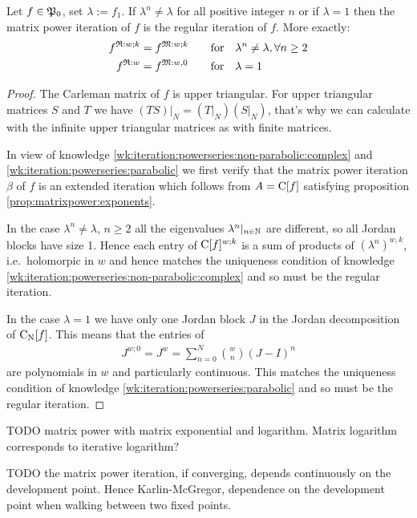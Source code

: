 \documentclass{article}
\numberwithin{equation}{section}
\begin{document}
\begin{proposition}
  Let $f\in\pso$, set $\lambda:=f_1$. If $\lambda^n \neq \lambda$ for all
  positive integer $n$ or if $\lambda=1$ then the matrix
  power iteration of $f$ is the regular iteration of
  $f$. More exactly:
  \begin{align*}
    \regitO{f}{w;k} &= \matitO{f}{w;k}&&\mt{for}\lambda^n \neq \lambda,
    \forall n\ge 2\\
    \regitO{f}{w} &= \matitO{f}{w,0}&&\mt{for} \lambda=1
  \end{align*}
\end{proposition}
\begin{proof}
  The Carleman matrix of $f$ is upper triangular. For upper
  triangular matrices $S$ and $T$ we have $(TS)|_N=(T|_N)(S|_N)$,
  that's why we can calculate with the infinite upper triangular
  matrices as with finite matrices.
  
  In view of knowledge
  \ref{wk:iteration:powerseries:non-parabolic:complex}
  and \ref{wk:iteration:powerseries:parabolic} we first verify
  that the matrix power iteration $\beta$ of $f$ is an extended
  iteration which follows from $A=\carl{f}$ satisfying proposition
  \ref{prop:matrixpower:exponents}.

  In the case $\lambda^n \neq \lambda$, $n\ge 2$ all the eigenvalues
  $\lambda^n|_{n\in\N}$ are different, so all Jordan blocks have size
  1. Hence each entry of $\carl{f}^{w;k}$ is a sum of products of
  $(\lambda^{n})^{w,k}$, i.e.\ holomorpic in $w$ and
  hence matches the uniqueness condition of
  knowledge \ref{wk:iteration:powerseries:non-parabolic:complex} and so must be
  the regular iteration.

  In the case $\lambda=1$ we have only one Jordan block $J$ in the Jordan
  decomposition of $\carlt{f}{N}$. This means that the entries of
  \begin{align*}
    J^{w;0}=J^w = \sum_{n=0}^N \binom{w}{n} (J-I)^n
  \end{align*}
  are polynomials in $w$ and particularly continuous. This matches
  the uniqueness condition of 
  knowledge \ref{wk:iteration:powerseries:parabolic} and so must be
  the regular iteration.
\end{proof}

TODO matrix power with matrix exponential and logarithm. Matrix
logarithm corresponds to iterative logarithm? 

TODO the matrix power iteration, if converging, depends continuously on the
development point. Hence Karlin-McGregor, dependence on the
development point when walking between two fixed points.
\end{document}
